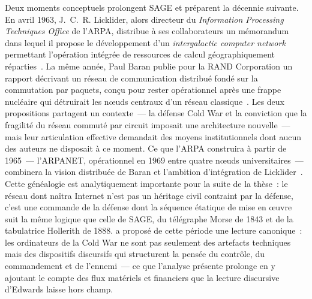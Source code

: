 %
Deux moments conceptuels prolongent SAGE et préparent la décennie suivante. En avril 1963, J.~C.~R. Licklider, alors directeur du \emph{Information Processing Techniques Office} de l'ARPA, distribue à ses collaborateurs un mémorandum dans lequel il propose le développement d'un \emph{intergalactic computer network} permettant l'opération intégrée de ressources de calcul géographiquement réparties~\parencite{licklider_memorandum_1963}. La même année, Paul Baran publie pour la RAND Corporation un rapport décrivant un réseau de communication distribué fondé sur la commutation par paquets, conçu pour rester opérationnel après une frappe nucléaire qui détruirait les nœuds centraux d'un réseau classique~\parencite{baran_distributed_1963}. Les deux propositions partagent un contexte~--- la défense Cold War et la conviction que la fragilité du réseau commuté par circuit imposait une architecture nouvelle~--- mais leur articulation effective demandait des moyens institutionnels dont aucun des auteurs ne disposait à ce moment. Ce que l'ARPA construira à partir de 1965~--- l'ARPANET, opérationnel en 1969 entre quatre nœuds universitaires~--- combinera la vision distribuée de Baran et l'ambition d'intégration de Licklider~\parencite{abbate_inventing_1999}. Cette généalogie est analytiquement importante pour la suite de la thèse~: le réseau dont naîtra Internet n'est pas un héritage civil contraint par la défense, c'est une commande de la défense dont la séquence étatique de mise en œuvre suit la même logique que celle de SAGE, du télégraphe Morse de 1843 et de la tabulatrice Hollerith de 1888. \textcite{edwards_closed_1996} a proposé de cette période une lecture canonique~: les ordinateurs de la Cold War ne sont pas seulement des artefacts techniques mais des dispositifs discursifs qui structurent la pensée du contrôle, du commandement et de l'ennemi~--- ce que l'analyse présente prolonge en y ajoutant le compte des flux matériels et financiers que la lecture discursive d'Edwards laisse hors champ.


